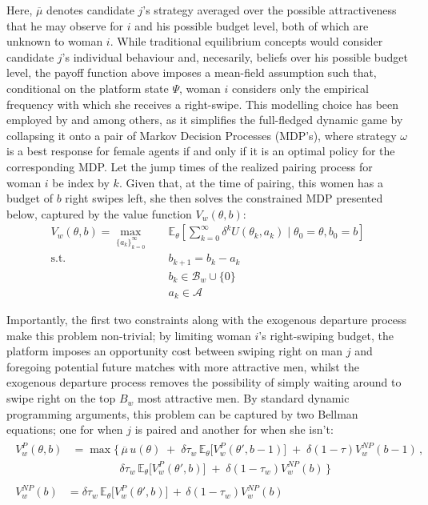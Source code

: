 Here, $\overline\mu$ denotes candidate $j$'s strategy averaged over the possible attractiveness that he may observe for $i$ and his possible budget level, both of which are unknown to woman $i$. While traditional equilibrium concepts would consider candidate $j$'s individual behaviour and, necesarily, beliefs over his possible budget level, the payoff function above imposes a mean-field assumption such that, conditional on the platform state $\Psi$, woman $i$ considers only the empirical frequency with which she receives a right-swipe. This modelling choice has been employed by \cite{immorlica2021designing} and \cite{iyer2014mean} among others, as it simplifies the full-fledged dynamic game by collapsing it onto a pair of Markov Decision Processes (MDP's), where strategy $\omega$ is a best response for female agents if and only if it is an optimal policy for the corresponding MDP. Let the jump times of the realized pairing process for woman $i$ be index by $k$. Given that, at the time of pairing, this women has a budget of $b$ right swipes left, she then solves the constrained MDP presented below, captured by the value function $V_w(\theta,b)$: 
\begin{equation*}
    \begin{aligned} 
        V_w(\theta,b)=\max_{\{a_k\}^\infty_{k=0}} \quad & \mathbb{E}_{\theta}\left[\sum^\infty_{k=0} \delta^{k} U(\theta_k, a_k) \;|\; \theta_0=\theta, b_0=b\right]\\ 
        \textrm{s.t.} \quad & b_{k+1} = b_k -a_k \\
        & b_k\in \mathcal{B}_w \cup \{0\} \\
        & a_k\in \mathcal{A}  
    \end{aligned}
\end{equation*}

Importantly, the first two constraints along with the exogenous departure process make this problem non-trivial; by limiting woman $i$'s right-swiping budget, the platform imposes an opportunity cost between swiping right on man $j$ and foregoing potential future matches with more attractive men, whilst the exogenous departure process removes the possibility of simply waiting around to swipe right on the top $B_w$ most attractive men. By standard dynamic programming arguments, this problem can be captured by two Bellman equations; one for when $j$ is paired and another for when she isn't: 
\begin{align}
    \begin{split} 
        V^{P}_w(\theta,b) &=\max \Big\{ \, \overline{\mu}\, u(\theta) \;+\; \delta \tau_w \,\mathbb{E}_\theta \Big[V^P_w(\theta', b-1)\Big] \;+\; \delta (1-\tau)V^{NP}_w(b-1) \, ,\\[6pt]
        & \quad\quad\quad\quad\;\delta \tau_w \, \mathbb{E}_\theta\Big[ V^P_w(\theta', b) \Big] \;+\; \delta (1-\tau_w) V^{NP}_w(b) \, \Big\}
    \end{split}\\[10pt]
    \begin{split}
        V^{NP}_w(b) &= {}\delta \tau_w \,\mathbb{E}_\theta \Big[ V^P_w(\theta', b)\Big] \,+\, \delta (1-\tau_w) V^{NP}_w(b)
    \end{split} 
\end{align} 


